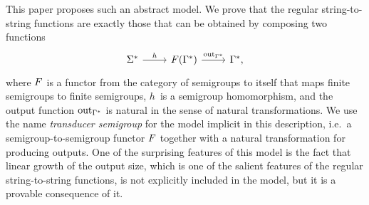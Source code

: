 This paper proposes such an abstract model.  We prove that the regular  string-to-string functions are exactly those that can be obtained by composing two functions
\[
\begin{tikzcd}
    \Sigma^* 
    \ar[r,"h"]
    & 
    \functor(\Gamma^*)
    \ar[r,"\outfun_{\Gamma^*}"]
    &
    \Gamma^*,
\end{tikzcd}
\]
where $\functor$ is a functor from the category of semigroups to itself that maps finite semigroups to finite semigroups, $h$~is a semigroup homomorphism, and the output function $\mathrm{out}_{\Gamma^*}$ is natural in the sense of natural transformations. We use the name \emph{transducer semigroup} for the model implicit in this description, i.e.~a semigroup-to-semigroup functor $\functor$ together with a natural transformation for producing outputs.  One of the surprising features of this model is the fact that linear growth of the output size, which is one of the salient features of the regular string-to-string functions, is not explicitly included in the model, but it is a provable consequence of it. 



